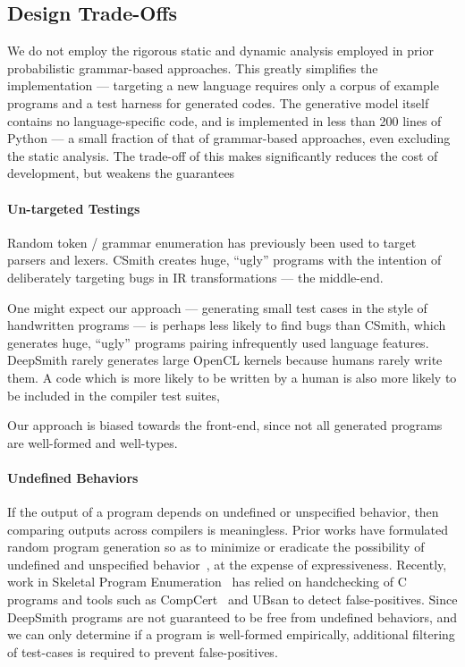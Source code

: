 \subsection{Design Trade-Offs}\label{subsec:discussions}

We do not employ the rigorous static and dynamic analysis employed in prior probabilistic grammar-based approaches. This greatly simplifies the implementation --- targeting a new language requires only a corpus of example programs and a test harness for generated codes. The generative model itself contains no language-specific code, and is implemented in less than 200 lines of Python --- a small fraction of that of grammar-based approaches, even excluding the static analysis. The trade-off of this makes significantly reduces the cost of development, but weakens the guarantees  \cc{\ldots}

\paragraph{Un-targeted Testings} Random token / grammar enumeration has previously been used to target parsers and lexers. CSmith creates huge, ``ugly'' programs with the intention of deliberately targeting bugs in IR transformations --- the middle-end.

One might expect our approach --- generating small test cases in the style of handwritten programs --- is perhaps less likely to find bugs than CSmith, which generates huge, ``ugly'' programs pairing infrequently used language features. DeepSmith rarely generates large OpenCL kernels because humans rarely write them. A code which is more likely to be written by a human is also more likely to be included in the compiler test suites, 

Our approach is biased towards the front-end, since not all generated programs are well-formed and well-types.

\paragraph{Undefined Behaviors} %
If the output of a program depends on undefined or unspecified behavior, then comparing outputs across compilers is meaningless. Prior works have formulated random program generation so as to minimize or eradicate the possibility of undefined and unspecified behavior~\cite{Yang2011c,Le2013a,Le2015}, at the expense of expressiveness. Recently, work in Skeletal Program Enumeration~\cite{Zhang2017a} has relied on handchecking of C programs and tools such as CompCert~\cite{Leroy2013} and UBsan to detect false-positives. Since DeepSmith programs are not guaranteed to be free from undefined behaviors, and we can only determine if a program is well-formed empirically, additional filtering of test-cases is required to prevent false-positives.


